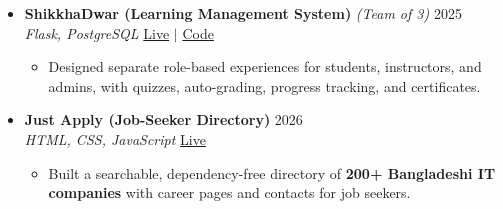 \documentclass[a4paper]{article}
\newcommand{\resumeItem}[1]{
  \item\small{
    {#1 \vspace{-2pt}}
  }
}
\newcommand{\resumeItemListStart}{\begin{itemize}}
\newcommand{\resumeItemListEnd}{\end{itemize}\vspace{-5pt}}
\begin{document}
\begin{itemize}[leftmargin=0.15in, label={}, itemsep=5pt]
    \item
    \textbf{ShikkhaDwar (Learning Management System)} \textit{\small (Team of 3)} \hfill 2025\\
    \small\textit{Flask, PostgreSQL} \hfill
    \href{https://shikkhadwar-81r2.onrender.com/}{Live} $|$
    \href{https://github.com/nihal-kabir/ShikkhaDwar}{Code}
    \vspace{-5pt}
    \resumeItemListStart
      \resumeItem{Designed separate role-based experiences for students, instructors, and admins, with quizzes, auto-grading, progress tracking, and certificates.}
    \resumeItemListEnd

    \item
    \textbf{Just Apply (Job-Seeker Directory)} \hfill 2026\\
    \small\textit{HTML, CSS, JavaScript} \hfill
    \href{https://badhon495.github.io/just-apply/}{Live}
    \vspace{-5pt}
    \resumeItemListStart
      \resumeItem{Built a searchable, dependency-free directory of \textbf{200+ Bangladeshi IT companies} with career pages and contacts for job seekers.}
    \resumeItemListEnd

  \end{itemize}


\end{document}
